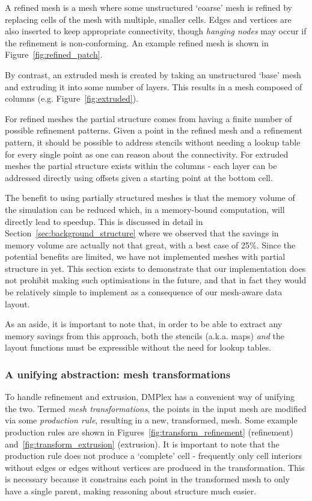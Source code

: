 A refined mesh is a mesh where some unstructured `coarse' mesh is refined by replacing cells of the mesh with multiple, smaller cells.
Edges and vertices are also inserted to keep appropriate connectivity, though \textit{hanging nodes} may occur if the refinement is non-conforming.
An example refined mesh is shown in Figure~\ref{fig:refined_patch}.

By contrast, an extruded mesh is created by taking an unstructured `base' mesh and extruding it into some number of layers.
This results in a mesh composed of columns (e.g. Figure~\ref{fig:extruded}).

For refined meshes the partial structure comes from having a finite number of possible refinement patterns.
Given a point in the refined mesh and a refinement pattern, it should be possible to address stencils without needing a lookup table for every single point as one can reason about the connectivity.
For extruded meshes the partial structure exists within the columns - each layer can be addressed directly using offsets given a starting point at the bottom cell.

The benefit to using partially structured meshes is that the memory volume of the simulation can be reduced which, in a memory-bound computation, will directly lead to speedup.
This is discussed in detail in Section~\ref{sec:background_structure} where we observed that the savings in memory volume are actually not that great, with a best case of 25\%.
Since the potential benefits are limited, we have not implemented meshes with partial structure in  yet.
This section exists to demonstrate that our implementation does not prohibit making such optimisations in the future, and that in fact they would be relatively simple to implement as a consequence of our mesh-aware data layout.

As an aside, it is important to note that, in order to be able to extract any memory savings from this approach, both the stencils (a.k.a. maps) \textit{and} the layout functions must be expressible without the need for lookup tables.

\subsubsection{A unifying abstraction: mesh transformations}

To handle refinement and extrusion, DMPlex has a convenient way of unifying the two.
Termed \textit{mesh transformations}, the points in the input mesh are modified via some \textit{production rule}, resulting in a new, transformed, mesh.
Some example production rules are shown in Figures~\ref{fig:transform_refinement} (refinement) and~\ref{fig:transform_extrusion} (extrusion).
It is important to note that the production rule does not produce a `complete' cell - frequently only cell interiors without edges or edges without vertices are produced in the transformation.
This is necessary because it constrains each point in the transformed mesh to only have a single parent, making reasoning about structure much easier.


